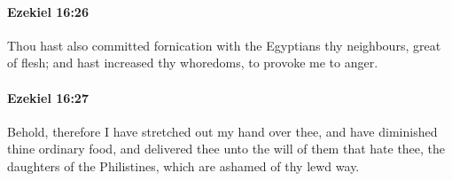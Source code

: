 		\paragraph{Ezekiel 16:26} %
			\label{EZEKIEL-16-26}

			Thou hast also committed fornication with the Egyptians thy neighbours, great of flesh; and hast increased thy whoredoms, to provoke me to anger.


		\paragraph{Ezekiel 16:27} %
			\label{EZEKIEL-16-27}

			Behold, therefore I have stretched out my hand over thee, and have diminished thine ordinary food, and delivered thee unto the will of them that hate thee, the daughters of the Philistines, which are ashamed of thy lewd way.

